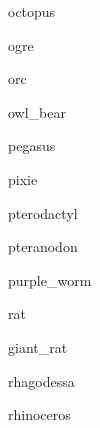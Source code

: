 \documentclass[letterpaper,serif]{module}
\begin{document}
\begin{newmonster}{octopus}\end{newmonster}

\begin{newmonster}{ogre}\end{newmonster}

\begin{newmonster}{orc}\end{newmonster}

\begin{newmonster}{owl_bear}\end{newmonster}

\begin{newmonster}{pegasus}\end{newmonster}

\begin{newmonster}{pixie}\end{newmonster}


\begin{newmonster}{pterodactyl}\end{newmonster}

\begin{newmonster}{pteranodon}\end{newmonster}

\begin{newmonster}{purple_worm}\end{newmonster}


\begin{newmonster}{rat}\end{newmonster}

\begin{newmonster}{giant_rat}\end{newmonster}

\begin{newmonster}{rhagodessa}\end{newmonster}


\begin{newmonster}{rhinoceros}\end{newmonster}
\end{document}
